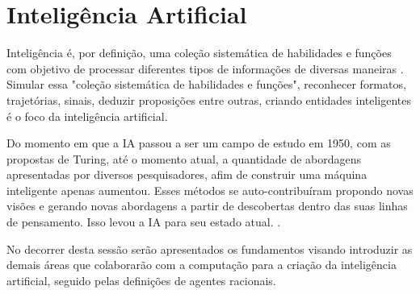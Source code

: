 \section{Inteligência Artificial}

Inteligência é, por definição, uma coleção sistemática de habilidades e funções com objetivo de processar diferentes tipos de informações de diversas maneiras \cite[49]{guilford1982cognitive}. Simular essa "coleção sistemática de habilidades e funções", reconhecer formatos, trajetórias, sinais, deduzir proposições entre outras, criando entidades inteligentes é o foco da inteligência artificial.

Do momento em que a IA passou a ser um campo de estudo em 1950, com as propostas de Turing, até o momento atual, a quantidade de abordagens apresentadas por diversos pesquisadores, afim de construir uma máquina inteligente apenas aumentou. Esses métodos se auto-contribuíram propondo novas visões e gerando novas abordagens a partir de descobertas dentro das suas linhas de pensamento. Isso levou a IA para seu estado atual. \cite[1-2]{russell2003artificial}.

No decorrer desta sessão serão apresentados os fundamentos visando introduzir as demais áreas que colaborarão com a computação para a criação da inteligência artificial, seguido pelas definições de agentes racionais.



